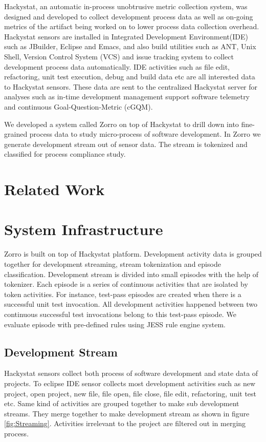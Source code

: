 \documentclass[11pt,twocolumn]{article}
\begin{document}
Hackystat\cite{csdl2-01-13}, an automatic in-process unobtrusive metric
collection system, was designed and developed to collect development
process data as well as on-going metrics of the artifact being worked on
to lower process data collection overhead. Hackystat sensors
\cite{HackystatSensor} are installed in Integrated Development
Environment(IDE) such as JBuilder, Eclipse and Emacs, and also build
utilities such as ANT, Unix Shell, Version Control System (VCS) and issue
tracking system to collect development process data automatically.  IDE
activities such as file edit, refactoring, unit test execution, debug and
build data etc are all interested data to Hackystat sensors. These data are
sent to the centralized Hackystat server for analyses such as in-time
development management support software telemetry \cite{csdl2-04-11} and
continuous Goal-Question-Metric (cGQM).

We developed a system called Zorro on top of Hackystat to drill down into
fine-grained process data to study micro-process of software development.
In Zorro we generate development stream out of sensor data. The stream is
tokenized and classified for process compliance study.

\section{Related Work}
\label{sec:rel}

\section{System Infrastructure}
\label{sec:sys}
Zorro is built on top of Hackystat platform. Development activity data is
grouped together for development streaming, stream tokenization and episode
classification. Development stream is divided into small episodes with the
help of tokenizer. Each episode is a series of continuous activities that
are isolated by token activities. For instance, test-pass episodes are
created when there is a successful unit test invocation. All development
activities happened between two continuous successful test invocations
belong to this test-pass episode. We evaluate episode with pre-defined
rules using JESS \cite{Friedman-Hill:03} rule engine system.

\subsection{Development Stream}
Hackystat sensors collect both process of software development and state
data of projects. To eclipse IDE sensor collects most development
activities such as new project, open project, new file, file open, file
close, file edit, refactoring, unit test etc. Same kind of activities
are grouped together to make sub development streams. They merge together to
make development stream as shown in figure \ref{fig:Streaming}. Activities
irrelevant to the project are filtered out in merging process.
\end{document}
